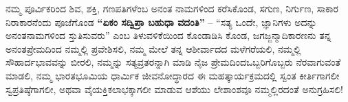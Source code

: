 ನಮ್ಮ ಪೂರ್ವಿಕರಿಂದ ಶಿವ, ಶಕ್ತಿ, ಗಣಪತಿಗಳೆಂಬ ಅನಂತ ನಾಮಗಳಿಂದ ಕರೆಸಿಕೊಂಡ, ಸಗುಣ, ನಿರ್ಗುಣ, ಸಾಕಾರ ನಿರಾಕಾರನೆಂದು ಪೂಜೆಗೊಂಡ \textbf{“ಏಕಂ ಸದ್ವಿಪ್ರಾ ಬಹುಧಾ ವದಂತಿ”} – “ಸತ್ಯ ಒಂದೇ, ಜ್ಞಾನಿಗಳು ಅದನ್ನು ಅನಂತನಾಮಗಳಿಂದ ಸ್ತುತಿಸುವರು” ಎಂಬ ತಿಳುವಳಿಕೆಯಿಂದ ಕೊಂಡಾಡಿಸಿ ಕೊಂಡ, ಜಗಜ್ಜನ್ಮಾದಿಕಾರಣನು ತನ್ನ ಅನಂತಪ್ರೇಮದಿಂದ ನಮ್ಮಲ್ಲಿ ಪ್ರವೇಶಿಸಲಿ, ನಮ್ಮ ಮೇಲೆ ತನ್ನ ಆಶೀರ್ವಾದದ ಮಳೆಗರೆಯಲಿ, ನಮ್ಮಲ್ಲಿ ಸೌಹಾರ್ದ\-ಭಾವವನ್ನು ಬೀರಲಿ, ನಮ್ಮನ್ನು ಸತ್ಯವ್ರತರನ್ನಾಗಿ ಮಾಡಿ ನೈಜ ಪ್ರೇಮದಿಂದ\break ಒಬ್ಬರಿಗೊಬ್ಬರು ನೆರವಾಗುವಂತೆ ಮಾಡಲಿ, ನಮ್ಮ ಭಾರತಭೂಮಿಯ ಧಾರ್ಮಿಕ ಜೀವನೋದ್ಧಾರದ ಈ ಮಹತ್ಕಾರ್ಯಕ್ರಮದಲ್ಲಿ ಸ್ವಂತ ಕೀರ್ತಿಗಾಗಲೀ ಸ್ವಪ್ರತಿಷ್ಠೆಗಾಗಲೀ, ಅಥವಾ ವೈಯಕ್ತಿಕಲಾಭಕ್ಕಾಗಲೀ ಮಾಡುವ ಆಶೆಯು ಲೇಶಾಂಶವೂ ನಮ್ಮಲ್ಲಿರದಂತೆ ಅನುಗ್ರಹಿಸಲಿ!

